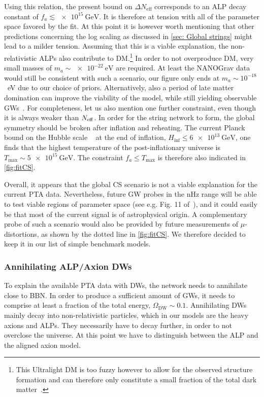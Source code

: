 \documentclass{article}
\newcommand*{\Neff}{\ensuremath{N_\mathrm{eff}}\xspace}
\begin{document}
Using this relation, the present bound on $\Delta \Neff$ corresponds to an ALP decay constant of $f_{a}\lesssim \SI{e15}{\GeV}$. It is therefore at tension with all of the parameter space favored by the fit. At this point it is however worth mentioning that other predictions concerning the log scaling as discussed in \cref{sec: Global strings} might lead to a milder tension. 
Assuming that this is a viable explanation, the non-relativistic ALPs also contribute to DM.\footnote{This Ultralight DM is too fuzzy however to allow for the observed structure formation and can therefore only constitute a small fraction of the total dark matter~\cite{Gorghetto:2021fsn}.} In order to not overproduce DM, very small masses of $m_a\sim \SI{e-22}{\eV}$ are required. At least the NANOGrav data would still be consistent with such a scenario, our figure only ends at $m_a\sim 10^{-18}$~eV due to our choice of priors. Alternatively, also a period of late matter domination can improve the viability of the model, while still yielding observable GWs~\cite{Ramberg:2019dgi, Chang:2021afa, Gouttenoire:2021jhk,Ghoshal:2023sfa}. For completeness, let us also mention one further constraint, even though it is always weaker than $N_{\rm eff}$. In order for the string network to form, the global symmetry should be broken after inflation and reheating. The current Planck bound on the Hubble scale ~\cite{Planck:2018vyg} at the end of inflation, $H_\mathrm{inf} \leq \SI{6e13}{\GeV}$, one finds that the highest temperature of the post-inflationary universe is $T_\mathrm{max} \sim \SI{5e15}{\GeV}$. The constraint $f_{a}\leq T_\mathrm{max}$ is therefore also indicated in \cref{fig:fitCS}. 

Overall, it appears that the global CS scenario is not a viable explanation for the current PTA data. Nevertheless, future GW probes in the nHz range will be able to test viable regions of parameter space (see e.g. Fig. 11 of~\cite{Ramberg:2022irf}), and it could easily be that most of the current signal is of astrophysical origin. A complementary probe of such a scenario would also be provided by future measurements of $\mu$-distortions, as shown by the dotted line in \cref{fig:fitCS}. We therefore decided to keep it in our list of simple benchmark models. 

%
\subsubsection{Annihilating ALP/Axion DWs}\label{sec:ALP_DW_results}
%
To explain the available PTA data with DWs, the network needs to annihilate close to BBN.
In order to produce a sufficient amount of GWs, it needs to comprise at least a fraction of the total energy, $\Omega_\mathrm{DW}\sim 0.1$. 
Annihilating DWs mainly decay into non-relativistic particles, which in our models are the heavy axions and ALPs. They necessarily have to decay further, in order to not overclose the universe. At this point we have to distinguish between the ALP and the aligned axion model. 
\end{document}
